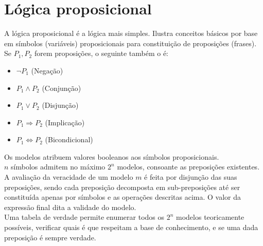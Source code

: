 \documentclass[]{report}
\begin{document}
\section{Lógica proposicional}
A lógica proposicional é a lógica mais simples. Ilustra conceitos básicos por base em símbolos (variáveis) proposicionais para constituição de proposições (frases).\\
Se $P_1, P_2$ forem proposições, o seguinte também o é:
\begin{itemize}
\item $\neg P_1$ (Negação)
\item $P_1 \wedge P_2$ (Conjunção)
\item $P_1 \vee P_2$ (Disjunção)
\item $P_1 \Rightarrow P_2$ (Implicação)
\item $P_1 \Leftrightarrow P_2$ (Bicondicional)
\end{itemize}
Os modelos atribuem valores booleanos aos símbolos proposicionais.\\
$n$ símbolos admitem no máximo $2^n$ modelos, consoante as preposições existentes.\\[5mm]
A avaliação da veracidade de um modelo $m$ é feita por disjunção das suas preposições, sendo cada preposição decomposta em sub-preposições até ser constituída apenas por símbolos e as operações descritas acima. O valor da expressão final dita a validade do modelo.\\[2mm]
Uma tabela de verdade permite enumerar todos os $2^n$ modelos teoricamente possíveis, verificar quais é que respeitam a base de conhecimento, e se uma dada preposição é sempre verdade.
\end{document}
